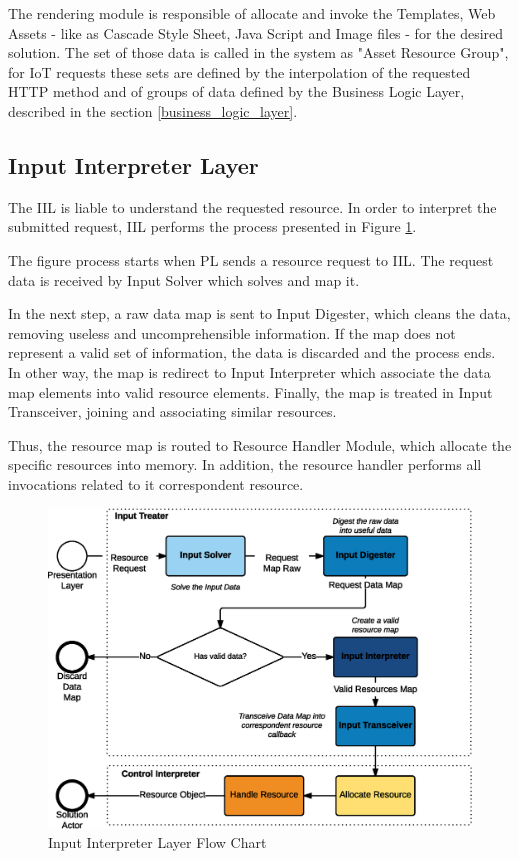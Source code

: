 \documentclass[3p,times]{elsarticle}
\begin{document}
The rendering module is responsible of allocate and invoke the Templates, Web Assets - like as Cascade Style Sheet, Java Script and Image files - for the desired solution. The set of those data is called in the system as "Asset Resource Group", for IoT requests these sets are defined by the interpolation of the requested HTTP method and of groups of data defined by the Business Logic Layer, described in the section \ref{business_logic_layer}.

\subsection{Input Interpreter Layer}
\label{input_interpreter_layer}

The IIL is liable to understand the requested resource. In order to interpret the submitted request, IIL performs the process presented in Figure \ref{fig_iil_flowchart}.

The figure process starts when PL sends a resource request to IIL. The request data is received by Input Solver which solves and map it.

In the next step, a raw data map is sent to Input Digester, which cleans the data, removing useless and uncomprehensible information. 
If the map does not represent a valid set of information, the data is discarded and the process ends.
In other way, the map is redirect to Input Interpreter which associate the data map elements into valid resource elements. 
Finally, the map is treated in Input Transceiver, joining and associating similar resources. 

Thus, the resource map is routed to Resource Handler Module, which allocate the specific resources into memory.
In addition, the resource handler performs all invocations related to it correspondent resource.

\begin{figure}[!ht]
	\centering
	\includegraphics[scale=0.3]{iil_layer.eps}
	\caption{Input Interpreter Layer Flow Chart}
	\label{fig_iil_flowchart}
\end{figure}
\end{document}
